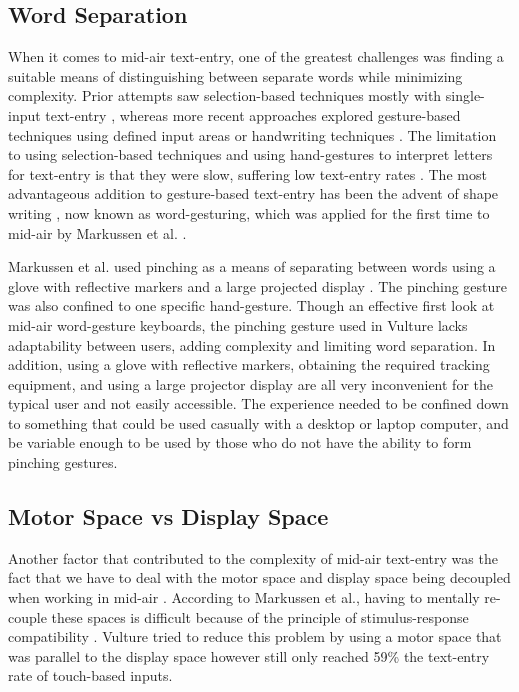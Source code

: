 \subsection{Word Separation}
When it comes to mid-air text-entry, one of the greatest challenges was finding a suitable means of distinguishing between separate words while minimizing complexity. Prior attempts saw selection-based techniques mostly with single-input text-entry \cite{ref_selection_based_mid_air,ref_mid_air_text_large_displays}, whereas more recent approaches explored gesture-based techniques \cite{ref_airstroke,ref_graffiti_vs_unistroke,ref_continuous_recognition} using defined input areas or handwriting techniques \cite{ref_air_handwriting,ref_air_writing_continuous_recognition,ref_mid_air_text_entry_handwriting,ref_detecting_handwritten_characters}. The limitation to using selection-based techniques and using hand-gestures to interpret letters for text-entry is that they were slow, suffering low text-entry rates \cite{ref_selection_based_mid_air,ref_mid_air_text_large_displays}. The most advantageous addition to gesture-based text-entry has been the advent of shape writing \cite{ref_shape_writing,ref_the_word_gesture_keyboard,ref_shapewriter_iphone,ref_shark_wgk,ref_shorthand_writing}, now known as word-gesturing, which was applied for the first time to mid-air by Markussen et al. \cite{ref_vulture}.

Markussen et al. used pinching as a means of separating between words using a glove with reflective markers and a large projected display \cite{ref_vulture}. The pinching gesture was also confined to one specific hand-gesture. Though an effective first look at mid-air word-gesture keyboards, the pinching gesture used in Vulture lacks adaptability between users, adding complexity and limiting word separation. In addition, using a glove with reflective markers, obtaining the required tracking equipment, and using a large projector display are all very inconvenient for the typical user and not easily accessible. The experience needed to be confined down to something that could be used casually with a desktop or laptop computer, and be variable enough to be used by those who do not have the ability to form pinching gestures.

\subsection{Motor Space vs Display Space}
Another factor that contributed to the complexity of mid-air text-entry was the fact that we have to deal with the motor space and display space being decoupled when working in mid-air \cite{ref_vulture}. According to Markussen et al., having to mentally re-couple these spaces is difficult because of the principle of stimulus-response compatibility \cite{ref_stimulus_response_compatibility}. Vulture tried to reduce this problem by using a motor space that was parallel to the display space however still only reached 59\% the text-entry rate of touch-based inputs.

